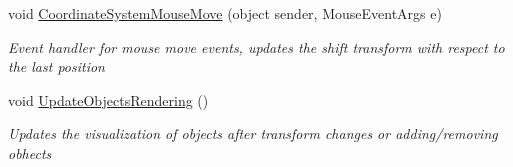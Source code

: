 \begin{DoxyCompactItemize}
void \hyperlink{class_w_p_f_visualization_base_1_1_drawing_on_coordinate_system_af7e96d16abd951b15cba2e4b09724762}{Coordinate\+System\+Mouse\+Move} (object sender, Mouse\+Event\+Args e)
\begin{DoxyCompactList}\small\item\em Event handler for mouse move events, updates the shift transform with respect to the last position \end{DoxyCompactList}\item 
void \hyperlink{class_w_p_f_visualization_base_1_1_drawing_on_coordinate_system_afddfb23af20a745a123173559a6e3331}{Update\+Objects\+Rendering} ()
\begin{DoxyCompactList}\small\item\em Updates the visualization of objects after transform changes or adding/removing obhects \end{DoxyCompactList}\end{DoxyCompactItemize}
